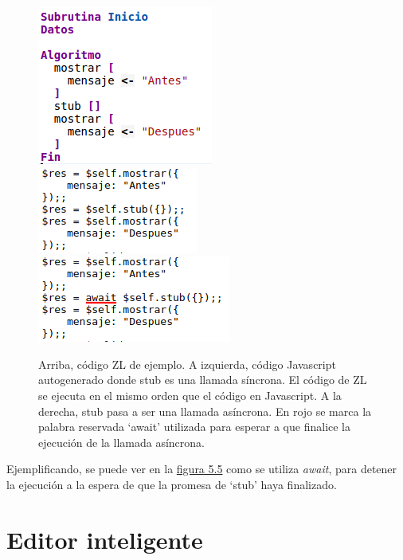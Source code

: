 \documentclass{report}
\begin{document}
	\vspace{10px}
	
\begin{figure}
	\centering
	\includegraphics{asincrono}	
	\\
	
	\includegraphics[width=0.45\linewidth]{asincrono3}
	\includegraphics[width=0.45\linewidth]{asincrono2}

	\caption[Diferencias entre código asíncrono y síncrono.]{Arriba, código ZL de ejemplo. A izquierda, código Javascript autogenerado donde stub es una llamada síncrona. El código de ZL se ejecuta en el mismo orden que el código en Javascript. A la derecha, stub pasa a ser una llamada asíncrona. En rojo se marca la palabra reservada `await' utilizada para esperar a que finalice la ejecución de la llamada asíncrona.}
\label{fig:asincrono}
\end{figure}


	 Ejemplificando, se puede ver en la \hyperref[fig:asincrono]{figura 5.5} como se utiliza \textit{await}, para detener la ejecución a la espera de que la promesa de `stub' haya finalizado.
	 	
	\section{Editor inteligente}
	
\end{document}
